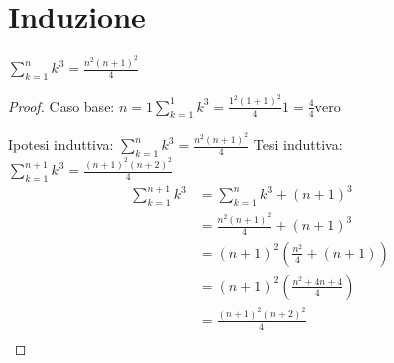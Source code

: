\chapter{Induzione}
\begin{thm}
    $\displaystyle \sum _{k=1} ^ n k^3 = \frac{n^2 (n+1)^2}{4}$
\end{thm}

\begin{proof}
Caso base: $n = 1 \sum _{k=1} ^ 1 k^3 = \frac{1^2(1+1)^2}{4} 1 = \frac{4}{4} \text{vero}$

Ipotesi induttiva: $\sum _{k=1} ^ n k^3 = \frac{n^2 (n+1)^2}{4}$
Tesi induttiva: $\sum _{k=1} ^ {n+1} k^3 = \frac{(n+1)^2 (n+2)^2}{4}$
\begin{equation*}
\begin{split}
\sum _{k=1} ^{n+1} k^3 & = \sum _{k=1} ^ n k^3 + (n+1)^3 \\
                       & = \frac{n^2 (n+1)^2}{4} + (n+1)^3 \\
                       & = (n+1)^2 (\frac{n^2}{4} + (n+1)) \\
                       & = (n+1)^2 (\frac{n^2 + 4n + 4}{4}) \\
                       & = \frac{(n+1)^2 (n+2)^2}{4} \\
\end{split}
\end{equation*}
\end{proof}
